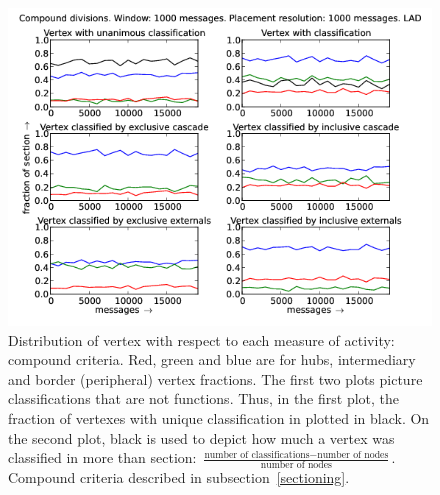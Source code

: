 \documentclass[%
 aip,
 jmp,%
 amsmath,amssymb,
 reprint,%
]{revtex4-1}
\begin{document}
\begin{figure}[hbtp] 
   \centering
        \includegraphics[width=\textwidth]{figs/LAD/1000_2}
    \caption{Distribution of vertex with respect to each measure of activity: compound criteria. Red, green and blue are for hubs, intermediary and border (peripheral) vertex fractions. The first two plots picture classifications that are not functions. Thus, in the first plot, the fraction of vertexes with unique classification in plotted in black. On the second plot, black is used to depict how much a vertex was classified in more than section: $\frac{\text{number of classifications} - \text{number of nodes}}{\text{number of nodes}}$. Compound criteria described in subsection~\ref{sectioning}.}
    \label{fig:lad1000_}
\end{figure}
\end{document}
